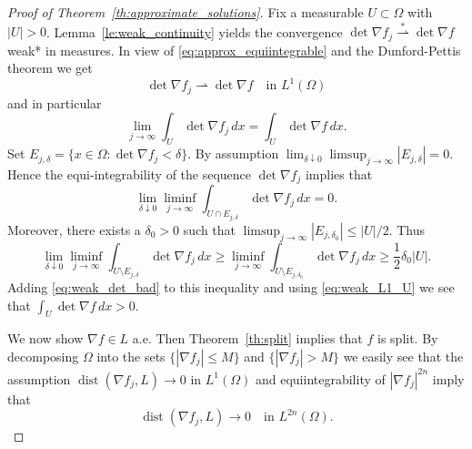 \documentclass[titlepage]{amsart}
\numberwithin{equation}{section}
\theoremstyle{plain}
\theoremstyle{definition}
\theoremstyle{remark}
\newcommand{\dist}{\operatorname{dist}}
\newcommand{\g}{\nabla }
\begin{document}
\begin{proof}[Proof of Theorem~\ref{th:approximate_solutions}]
Fix a measurable $U \subset \Omega$ with $|U| > 0$. 
Lemma~\ref{le:weak_continuity} yields the convergence $\det \g f_j \overset{*}{\rightharpoonup} \det \g f$ weak*
in measures.
In view of  \eqref{eq:approx_equiintegrable} and the Dunford-Pettis theorem we get
\begin{equation}  \label{eq:approx_weakL1_det}
\det \g f_j   \rightharpoonup \det \g f \quad \text{in $L^1(\Omega)$}
\end{equation}
and in particular 
\begin{equation}  \label{eq:weak_L1_U}
 \lim_{j \to \infty} \int_U \det \g f_j \, dx  = \int_U \det \g f \, dx.
\end{equation}
Set $E_{j, \delta} = \{ x \in \Omega : \det \g f_j < \delta \}$.
By assumption $\lim_{\delta \downarrow 0} \limsup_{j \to \infty} |E_{j, \delta}|= 0$.
Hence the equi-integrability of the sequence  $\det \g f_j$ implies that
\begin{equation}   \label{eq:weak_det_bad}
\lim_{\delta \downarrow 0} \liminf_{j \to \infty}  \int_{U \cap E_{j,\delta}} \det \g f_j \, dx = 0.
\end{equation}
Moreover, there exists a $\delta_0 > 0$ such that   $\limsup_{j \to \infty} |E_{j, \delta_0}| \le |U|/2$.
Thus 
\begin{equation*}  \label{eq:weak_det_good}
\lim_{\delta \downarrow 0}   \liminf_{j \to \infty}  \int_{U \setminus E_{j,\delta}} \det \g f_j\, dx
\ge     \liminf_{j \to \infty}  \int_{U \setminus E_{j,\delta_0}} \det \g f_j\, dx
 \ge  \frac12  \delta_0 |U|.
\end{equation*}
Adding  
  \eqref{eq:weak_det_bad}  to this inequality and using 
\eqref{eq:weak_L1_U} we see that $\int_U \det \g f \, dx > 0$. 


We now show $\g f \in L$ a.e. Then Theorem~\ref{th:split} implies that $f$ is 
split.
By decomposing  $\Omega$ into the sets $\{ |\g f_j| \le M\}$ and $\{ |\g f_j| > M\}$ we easily see that   the assumption $\dist(\g f_j, L) \to 0$ in $L^1(\Omega)$ and equiintegrability of $|\g f_j|^{2n}$ imply that 
\begin{equation}  \label{eq:convergence_dist_L2n}
\dist(\g f_j, L) \to 0 \quad \text{in $L^{2n}(\Omega)$}.
\end{equation}




\end{proof}
\end{document}
